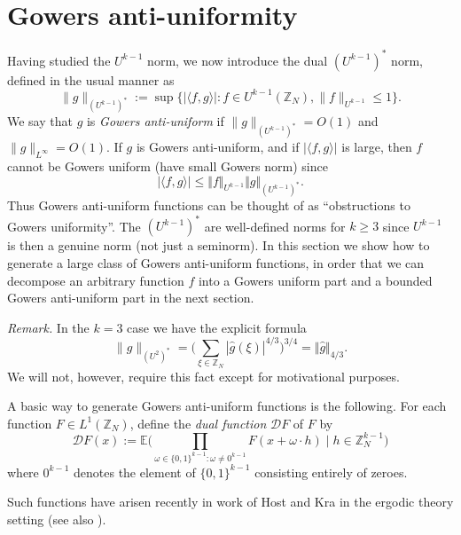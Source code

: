 \documentclass[12pt,a4paper,reqno]{amsart}
\numberwithin{equation}{section}
\theoremstyle{plain}
\theoremstyle{definition}
\renewcommand{\leq}{\leqslant}
\renewcommand{\geq}{\geqslant}
\def\Z{{\mathbb Z}}
\def\E{{\mathbb E}}
\def\vs{\vspace{11pt}}
\def\ni{\noindent}
\def\emph#1{{\it #1}}
\begin{document}
\section{Gowers anti-uniformity}\label{sec6}

\ni Having studied the $U^{k-1}$ norm, we now introduce the dual $(U^{k-1})^*$ norm, defined in the usual
manner as
\begin{equation}\label{dual-def}
 \| g \|_{(U^{k-1})^*} := \sup\{ |\langle f, g \rangle|: f \in U^{k-1}(\mathbb{Z}_N), \|f\|_{U^{k-1}} \leq 1 \}.
\end{equation}
We say that $g$ is \emph{Gowers anti-uniform} if $\|g\|_{(U^{k-1})^*} = O(1)$ and $\|g\|_{L^\infty} = O(1)$. If $g$ is Gowers anti-uniform, and if $|\langle f,g \rangle|$ is large, then $f$ cannot be Gowers uniform (have small Gowers norm) since
\[ |\langle f,g \rangle| \leq \Vert f \Vert_{U^{k-1}}\Vert g \Vert_{(U^{k-1})^*}.\]
Thus Gowers anti-uniform functions can be thought of as ``obstructions to Gowers uniformity''.
\ni The $(U^{k-1})^*$ are well-defined norms for $k \geq 3$ since $U^{k-1}$ is then a genuine norm (not just a seminorm).
In this section we show how to generate a large class of Gowers anti-uniform functions, in order that we can decompose an arbitrary
function $f$ into a Gowers uniform part and a bounded Gowers anti-uniform part in the next section.\vs

\ni\textit{Remark.} In the $k=3$ case we have the explicit formula \begin{equation}\label{star} \|g\|_{(U^2)^*} = \big(\sum_{\xi \in \Z_N} |\widehat{g}(\xi)|^{4/3}\big)^{3/4} = \Vert \widehat{g} \Vert_{4/3}.\end{equation} We will not, however, require this fact except for motivational purposes.\vs

\ni A basic way to generate Gowers anti-uniform functions is the following.  For each function $F \in L^1(\Z_N)$, define
the \emph{dual function} ${\mathcal D} F$ of $F$ by
\begin{equation}\label{cald}
 {\mathcal D} F(x) := 
\E\bigg( \prod_{\omega \in \{0,1\}^{k-1}: \omega \neq 0^{k-1}} F(x + \omega \cdot h) \; \bigg| \; h \in \mathbb{Z}_N^{k-1} \bigg)
\end{equation}
where $0^{k-1}$ denotes the element of $\{0,1\}^{k-1}$ consisting entirely of zeroes.\vs

\ni \emph{Remark.} Such functions have arisen recently in work of Host and Kra \cite{host-kra2} in the ergodic theory setting (see also \cite{assani}).\vs
\end{document}
